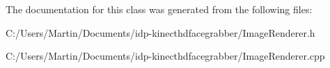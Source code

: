 The documentation for this class was generated from the following files\+:\begin{DoxyCompactItemize}
\item 
C\+:/\+Users/\+Martin/\+Documents/idp-\/kinecthdfacegrabber/Image\+Renderer.\+h\item 
C\+:/\+Users/\+Martin/\+Documents/idp-\/kinecthdfacegrabber/Image\+Renderer.\+cpp\end{DoxyCompactItemize}
